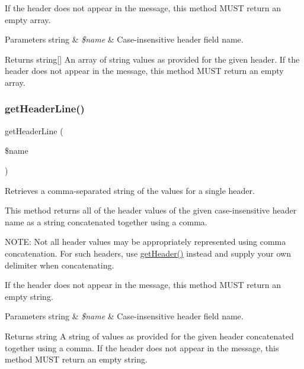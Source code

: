If the header does not appear in the message, this method M\+U\+ST return an empty array.


\begin{DoxyParams}[1]{Parameters}
string & {\em \$name} & Case-\/insensitive header field name. \\
\hline
\end{DoxyParams}
\begin{DoxyReturn}{Returns}
string\mbox{[}\mbox{]} An array of string values as provided for the given header. If the header does not appear in the message, this method M\+U\+ST return an empty array. 
\end{DoxyReturn}
\mbox{\label{class_pes_1_1_http_1_1_message_a365fa6b4f521682cab038b8ad9bff195}} 
\subsubsection{\texorpdfstring{get\+Header\+Line()}{getHeaderLine()}}
{\footnotesize\ttfamily get\+Header\+Line (\begin{DoxyParamCaption}\item[{}]{\$name }\end{DoxyParamCaption})}

Retrieves a comma-\/separated string of the values for a single header.

This method returns all of the header values of the given case-\/insensitive header name as a string concatenated together using a comma.

N\+O\+TE\+: Not all header values may be appropriately represented using comma concatenation. For such headers, use \mbox{\hyperlink{class_pes_1_1_http_1_1_message_a5b0169d9fabf145a619f35da410bc5d0}{get\+Header()}} instead and supply your own delimiter when concatenating.

If the header does not appear in the message, this method M\+U\+ST return an empty string.


\begin{DoxyParams}[1]{Parameters}
string & {\em \$name} & Case-\/insensitive header field name. \\
\hline
\end{DoxyParams}
\begin{DoxyReturn}{Returns}
string A string of values as provided for the given header concatenated together using a comma. If the header does not appear in the message, this method M\+U\+ST return an empty string. 
\end{DoxyReturn}
\mbox{\label{class_pes_1_1_http_1_1_message_a157e0005d82edaa21cbea07fdc5c62da}} 

